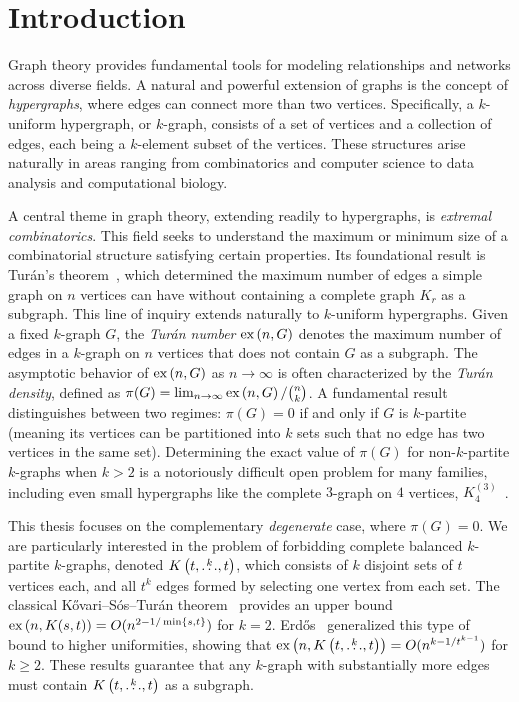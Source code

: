 \section{Introduction}\label{sec:introduction} %

Graph theory provides fundamental tools for modeling relationships and networks across diverse fields.
A natural and powerful extension of graphs is the concept of \emph{hypergraphs}, where edges can connect more than two vertices.
Specifically, a $k$-uniform hypergraph, or $k$-graph, consists of a set of vertices and a collection of edges, each being a $k$-element subset of the vertices.
These structures arise naturally in areas ranging from combinatorics and computer science to data analysis and computational biology.

A central theme in graph theory, extending readily to hypergraphs, is \emph{extremal combinatorics}.
This field seeks to understand the maximum or minimum size of a combinatorial structure satisfying certain properties.
Its foundational result is Turán's theorem~\cite{Turan1941},
which determined the maximum number of edges a simple graph on $n$
vertices can have without containing a complete graph $K_r$ as a subgraph.
This line of inquiry extends naturally to $k$-uniform hypergraphs.
Given a fixed $k$-graph $G$, the \emph{Turán number} $\text{ex} \left( n, G \right)$ denotes the maximum number of edges in a $k$-graph on $n$ vertices that does not contain $G$ as a subgraph.
The asymptotic behavior of $\text{ex} \left( n, G \right)$ as $n \to \infty$
is often characterized by the \emph{Turán density}, defined as $\pi(G) = \lim_{n \to \infty} \text{ex} \left( n, G \right) / \binom{n}{k}$.
A fundamental result distinguishes between two regimes: $\pi(G) = 0$ if and only if $G$ is $k$-partite
(meaning its vertices can be partitioned into $k$ sets such that no edge has two vertices in the same set).
Determining the exact value of $\pi(G)$ for non-$k$-partite $k$-graphs when $k > 2$
is a notoriously difficult open problem for many families, including even small hypergraphs like the complete $3$-graph on $4$ vertices,
$K_4^{(3)}$~\cite{keevash2011hypergraph, razborov20103}.

This thesis focuses on the complementary \emph{degenerate} case, where $\pi(G) = 0$.
We are particularly interested in the problem of forbidding complete balanced $k$-partite $k$-graphs,
denoted $K\left(t, \overset{k}{\dots}, t\right)$, which consists of $k$ disjoint sets of $t$ vertices each,
and all $t^k$ edges formed by selecting one vertex from each set.
The classical Kővari--Sós--Turán theorem~\cite{Kovari1954, Hylten1958} provides an upper bound $\text{ex} \left( n, K(s, t) \right) = O(n^{2 - 1/\min\{s,t\}})$ for $k=2$.
Erdős~\cite{Erods1964} generalized this type of bound to higher uniformities, showing that $\text{ex} \left( n, K\left(t, \overset{k}{\dots}, t\right) \right) = O(n^{k - 1/t^{k-1}})$ for $k \ge 2$.
These results guarantee that any $k$-graph with substantially more edges must contain $K\left(t, \overset{k}{\dots}, t\right)$ as a subgraph.

